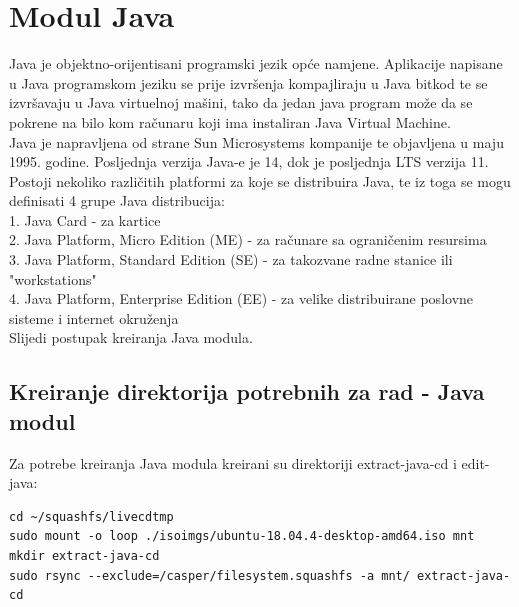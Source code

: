 \documentclass[12pt,vi]{mitthesis}
\begin{document}
\section*{Modul Java}
Java je objektno-orijentisani programski jezik opće namjene. Aplikacije napisane u Java programskom jeziku se prije izvršenja kompajliraju u Java bitkod te se izvršavaju u Java virtuelnoj mašini, tako da jedan java program može da se pokrene na bilo kom računaru koji ima instaliran Java Virtual Machine.\\
Java je napravljena od strane Sun Microsystems kompanije te objavljena u maju 1995. godine. Posljednja verzija Java-e je 14, dok je posljednja LTS verzija 11. Postoji nekoliko različitih platformi za koje se distribuira Java, te iz toga se mogu definisati 4 grupe Java distribucija:\\
1. Java Card - za kartice\\
2. Java Platform, Micro Edition (ME) - za računare sa ograničenim resursima\\
3. Java Platform, Standard Edition (SE) - za takozvane radne stanice ili "workstations"\\
4. Java Platform, Enterprise Edition (EE) - za velike distribuirane poslovne sisteme i internet okruženja\\
\indent
Slijedi postupak kreiranja Java modula.

\subsection*{Kreiranje direktorija potrebnih za rad - Java modul}
\indent
Za potrebe kreiranja Java modula kreirani su direktoriji extract-java-cd i edit-java:
\begin{lstlisting}[style=BashInputStyle]
cd ~/squashfs/livecdtmp
sudo mount -o loop ./isoimgs/ubuntu-18.04.4-desktop-amd64.iso mnt
mkdir extract-java-cd
sudo rsync --exclude=/casper/filesystem.squashfs -a mnt/ extract-java-cd
\end{lstlisting}
\end{document}
